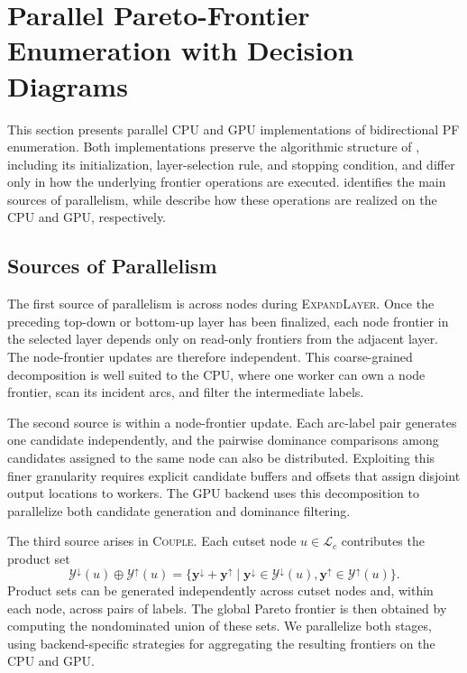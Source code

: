 \documentclass[letterpaper]{article}
\begin{document}
\section{Parallel Pareto-Frontier Enumeration with Decision Diagrams}
\label{sec:method}
This section presents parallel CPU and GPU implementations of bidirectional PF enumeration. Both implementations preserve the algorithmic structure of , including its initialization, layer-selection rule, and stopping condition, and differ only in how the underlying frontier operations are executed. 
 identifies the main sources of parallelism, while  describe how these operations are realized on the CPU and GPU, respectively.

\subsection{Sources of Parallelism}
\label{sec:parallel_primitives}

The first source of parallelism is across nodes during \textsc{ExpandLayer}. Once the preceding top-down or bottom-up layer has been finalized, each node frontier in the selected layer depends only on read-only frontiers from the adjacent layer. The node-frontier updates are therefore independent. This coarse-grained decomposition is well suited to the CPU, where one worker can own a node frontier, scan its incident arcs, and filter the intermediate labels.

The second source is within a node-frontier update. Each arc-label pair generates one candidate independently, and the pairwise dominance comparisons among candidates assigned to the same node can also be distributed. Exploiting this finer granularity requires explicit candidate buffers and offsets that assign disjoint output locations to workers. The GPU backend uses this decomposition to parallelize both candidate generation and dominance filtering.

The third source arises in \textsc{Couple}. Each cutset node $u\in\mathcal{L}_c$ contributes the product set
  \[
      \mathcal{Y}^{\downarrow}(u) \oplus \mathcal{Y}^{\uparrow}(u)
      =
      \{\mathbf{y}^{\downarrow} + \mathbf{y}^{\uparrow}
      \mid
      \mathbf{y}^{\downarrow} \in \mathcal{Y}^{\downarrow}(u),
      \mathbf{y}^{\uparrow} \in \mathcal{Y}^{\uparrow}(u)\}.
  \]
Product sets can be generated independently across cutset nodes and, within each node, across pairs of labels. The global Pareto frontier is then obtained by computing the nondominated union of these sets. We parallelize both stages, using backend-specific strategies for aggregating the resulting frontiers on the CPU and GPU.
\end{document}
